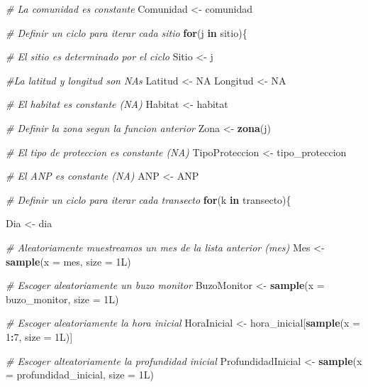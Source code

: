 \documentclass[]{krantz}
\makeatletter
\newenvironment{Shaded}{\begin{snugshade}}{\end{snugshade}}
\newcommand{\CommentTok}[1]{\textcolor[rgb]{0.56,0.35,0.01}{\textit{#1}}}
\newcommand{\ControlFlowTok}[1]{\textcolor[rgb]{0.13,0.29,0.53}{\textbf{#1}}}
\newcommand{\DataTypeTok}[1]{\textcolor[rgb]{0.13,0.29,0.53}{#1}}
\newcommand{\DecValTok}[1]{\textcolor[rgb]{0.00,0.00,0.81}{#1}}
\newcommand{\KeywordTok}[1]{\textcolor[rgb]{0.13,0.29,0.53}{\textbf{#1}}}
\newcommand{\NormalTok}[1]{#1}
\newcommand{\OperatorTok}[1]{\textcolor[rgb]{0.81,0.36,0.00}{\textbf{#1}}}
\newcommand{\OtherTok}[1]{\textcolor[rgb]{0.56,0.35,0.01}{#1}}
\newcommand{\StringTok}[1]{\textcolor[rgb]{0.31,0.60,0.02}{#1}}
\newenvironment{kframe}{%
\medskip{}
\setlength{\fboxsep}{.8em}
 \def\at@end@of@kframe{}%
 \ifinner\ifhmode%
  \def\at@end@of@kframe{\end{minipage}}%
  \begin{minipage}{\columnwidth}%
 \fi\fi%
 \def\FrameCommand##1{\hskip\@totalleftmargin \hskip-\fboxsep
 \colorbox{shadecolor}{##1}\hskip-\fboxsep
     \hskip-\linewidth \hskip-\@totalleftmargin \hskip\columnwidth}%
 \MakeFramed {\advance\hsize-\width
   \@totalleftmargin\z@ \linewidth\hsize
   \@setminipage}}%
 {\par\unskip\endMakeFramed%
 \at@end@of@kframe}
\renewenvironment{Shaded}{\begin{kframe}}{\end{kframe}}
\makeatother
\begin{document}
\begin{Shaded}
\begin{Highlighting}[]
  \CommentTok{# La comunidad es constante}
\NormalTok{  Comunidad <-}\StringTok{ }\NormalTok{comunidad}
  
  \CommentTok{# Definir un ciclo para iterar cada sitio}
  \ControlFlowTok{for}\NormalTok{(j }\ControlFlowTok{in}\NormalTok{ sitio)\{}
    
    \CommentTok{# El sitio es determinado por el ciclo}
\NormalTok{    Sitio <-}\StringTok{ }\NormalTok{j}
    
    \CommentTok{#La latitud y longitud son NAs}
\NormalTok{    Latitud <-}\StringTok{ }\OtherTok{NA}
\NormalTok{    Longitud <-}\StringTok{ }\OtherTok{NA}
    
    \CommentTok{# El habitat es constante (NA)}
\NormalTok{    Habitat <-}\StringTok{ }\NormalTok{habitat}
    
    \CommentTok{# Definir la zona segun la funcion anterior}
\NormalTok{    Zona <-}\StringTok{ }\KeywordTok{zona}\NormalTok{(j)}
    
    \CommentTok{# El tipo de proteccion es constante (NA)}
\NormalTok{    TipoProteccion <-}\StringTok{ }\NormalTok{tipo_proteccion}
    
    \CommentTok{# El ANP es constante (NA)}
\NormalTok{    ANP <-}\StringTok{ }\NormalTok{ANP}
    
    \CommentTok{# Definir un ciclo para iterar cada transecto}
    \ControlFlowTok{for}\NormalTok{(k }\ControlFlowTok{in}\NormalTok{ transecto)\{}
      
\NormalTok{      Dia <-}\StringTok{ }\NormalTok{dia}
      
      \CommentTok{# Aleatoriamente muestreamos un mes de la lista anterior (mes)}
\NormalTok{      Mes <-}\StringTok{ }\KeywordTok{sample}\NormalTok{(}\DataTypeTok{x =}\NormalTok{ mes,}
                    \DataTypeTok{size =}\NormalTok{ 1L)}
      
      \CommentTok{# Escoger aleatoriamente un buzo monitor}
\NormalTok{      BuzoMonitor <-}\StringTok{ }\KeywordTok{sample}\NormalTok{(}\DataTypeTok{x =}\NormalTok{ buzo_monitor,}
                            \DataTypeTok{size =}\NormalTok{ 1L)}
      
      \CommentTok{# Escoger aleatoriamente la hora inicial}
\NormalTok{      HoraInicial <-}\StringTok{ }\NormalTok{hora_inicial[}\KeywordTok{sample}\NormalTok{(}\DataTypeTok{x =} \DecValTok{1}\OperatorTok{:}\DecValTok{7}\NormalTok{,}
                                         \DataTypeTok{size =}\NormalTok{ 1L)]}
      
      \CommentTok{# Escoger alteatoriamente la profundidad inicial}
\NormalTok{      ProfundidadInicial <-}\StringTok{ }\KeywordTok{sample}\NormalTok{(}\DataTypeTok{x =}\NormalTok{ profundidad_inicial,}
                                   \DataTypeTok{size =}\NormalTok{ 1L)}
      

\end{Highlighting}
\end{Shaded}
\end{document}
